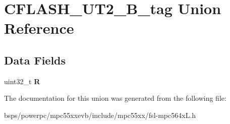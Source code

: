 \hypertarget{unionCFLASH__UT2__32B__tag}{}\section{C\+F\+L\+A\+S\+H\+\_\+\+U\+T2\+\_\+B\+\_\+tag Union Reference}
\label{unionCFLASH__UT2__32B__tag}
\subsection*{Data Fields}
\begin{DoxyCompactItemize}
\item 
\mbox{\label{unionCFLASH__UT2__32B__tag_aa6014f3de9129fe117034ba07aa20a14}} 
uint32\+\_\+t {\bfseries R}
\end{DoxyCompactItemize}


The documentation for this union was generated from the following file\+:\begin{DoxyCompactItemize}
\item 
bsps/powerpc/mpc55xxevb/include/mpc55xx/fsl-\/mpc564x\+L.\+h\end{DoxyCompactItemize}
